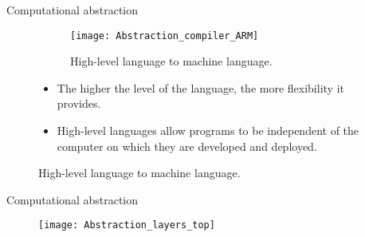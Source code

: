 \begin{frame}{Computational abstraction}
\vspace{-5pt}
\begin{figure}[!htb]
  \centering
  \begin{minipage}{.49\linewidth}
      \begin{figure}
        \centering
        \texttt{[image: Abstraction\_compiler\_ARM]}
        \label{Figure:abstraction_compiler}
        \vspace{-8pt}
        \caption{High-level language to machine language.}
      \end{figure}
  \end{minipage}
  \begin{minipage}{.49\linewidth}
      \begin{itemize}
      \item The higher the level of the language, the more flexibility it provides.
      \item High-level languages allow programs to be
independent of the computer on which they are developed and deployed.
      \end{itemize}
  \end{minipage}
\end{figure}

\end{frame}

\begin{frame}{Computational abstraction}
\begin{figure}[!htb]
  \centering
  \texttt{[image: Abstraction\_layers\_top]}
  \label{Figure:Abstraction_gap_top}
\end{figure}
\end{frame}

